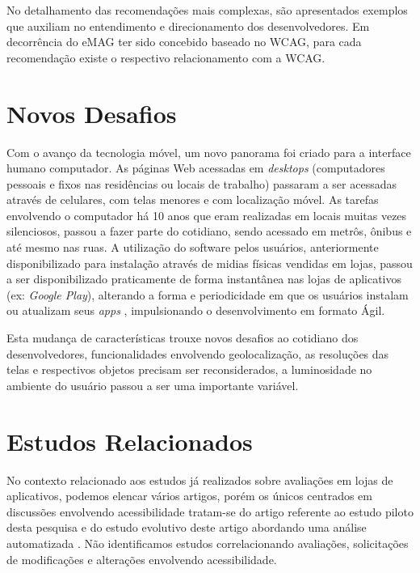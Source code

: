 No detalhamento das recomendações mais complexas, são apresentados exemplos que auxiliam no entendimento e direcionamento dos desenvolvedores. Em decorrência do eMAG ter sido concebido baseado no WCAG, para cada recomendação existe o respectivo relacionamento com a WCAG.


 
\section{Novos Desafios}
Com o avanço da tecnologia móvel, um novo panorama foi criado para a interface humano computador. As páginas Web acessadas em \textit{desktops} (computadores pessoais e fixos nas residências ou locais de trabalho) passaram a ser acessadas através de celulares, com telas menores e com localização móvel. As tarefas envolvendo o computador há 10 anos que eram realizadas em locais muitas vezes silenciosos, passou a fazer parte do cotidiano, sendo acessado em metrôs, ônibus e até mesmo nas ruas. A utilização do software pelos usuários, anteriormente disponibilizado para instalação através de midias físicas vendidas em lojas, passou a ser disponibilizado praticamente de forma instantânea nas lojas de aplicativos (ex: \textit{Google Play}), alterando a forma e periodicidade em que os usuários instalam ou atualizam seus \textit{apps} \cite{nayebi}, impulsionando o desenvolvimento em formato Ágil.

Esta mudança de características trouxe novos desafios ao cotidiano dos desenvolvedores, funcionalidades envolvendo geolocalização, as resoluções das telas e respectivos objetos precisam ser reconsiderados, a luminosidade no ambiente do usuário passou a ser uma importante variável.

\section{Estudos Relacionados}
No contexto relacionado aos estudos já realizados sobre avaliações em lojas de aplicativos, podemos elencar vários artigos, porém os únicos centrados em discussões envolvendo acessibilidade tratam-se do artigo referente ao estudo piloto desta pesquisa \cite{ihc2019} e do estudo evolutivo deste artigo abordando uma análise automatizada \cite{rochestertamjeed}. Não identificamos estudos correlacionando avaliações, solicitações de modificações e alterações envolvendo acessibilidade.


